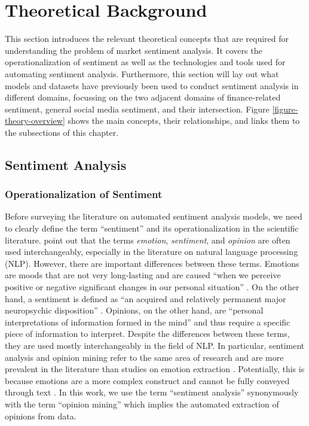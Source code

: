\section{Theoretical Background}
This section introduces the relevant theoretical concepts that are required for understanding the problem of market sentiment analysis. It covers the operationalization of sentiment as well as the technologies and tools used for automating sentiment analysis. Furthermore, this section will lay out what models and datasets have previously been used to conduct sentiment analysis in different domains, focussing on the two adjacent domains of finance-related sentiment, general social media sentiment, and their intersection. Figure \ref{figure-theory-overview} shows the main concepts, their relationships, and links them to the subsections of this chapter.



\subsection{Sentiment Analysis}
\label{section-sa}
\subsubsection{Operationalization of Sentiment}
Before surveying the literature on automated sentiment analysis models, we need to clearly define the term ``sentiment'' and its operationalization in the scientific literature.  point out that the terms \emph{emotion}, \emph{sentiment}, and \emph{opinion} are often used interchangeably, especially in the literature on natural language processing (NLP). However, there are important differences between these terms. Emotions are moods that are not very long-lasting and are caused ``when we perceive positive or negative significant changes in our personal situation'' . On the other hand, a sentiment is defined as ``an acquired and relatively permanent major neuropsychic disposition'' \cite[p.~16]{cattell1940sentiment}. Opinions, on the other hand, are ``personal interpretations of information formed in the mind'' \cite[p.~4]{munezero2014they} and thus require a specific piece of information to interpret. Despite the differences between these terms, they are used mostly interchangeably in the field of NLP. In particular, sentiment analysis and opinion mining refer to the same area of research \cite{liu2012book} and are more prevalent in the literature than studies on emotion extraction . Potentially, this is because emotions are a more complex construct and cannot be fully conveyed through text . In this work, we use the term ``sentiment analysis'' synonymously with the term ``opinion mining'' which implies the automated extraction of opinions from data.


